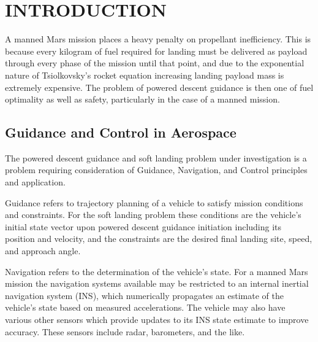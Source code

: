 %

\chapter{INTRODUCTION}
\label{chap:intro}
A manned Mars mission places a heavy penalty on propellant inefficiency. This is because every kilogram of fuel required for landing must be delivered as payload through every phase of the mission until that point, and due to the exponential nature of Tsiolkovsky's rocket equation increasing landing payload mass is extremely expensive. The problem of powered descent guidance is then one of fuel optimality as well as safety, particularly in the case of a manned mission. 


\section{Guidance and Control in Aerospace} \label{sec:guidancevcontrol}
The powered descent guidance and soft landing problem under investigation is a problem requiring consideration of Guidance, Navigation, and Control principles and application. 

Guidance refers to trajectory planning of a vehicle to satisfy mission conditions and constraints. For the soft landing problem these conditions are the vehicle's initial state vector upon powered descent guidance initiation including its position and velocity, and the constraints are the desired final landing site, speed, and approach angle.

Navigation refers to the determination of the vehicle's state. For a manned Mars mission the navigation systems available may be restricted to an internal inertial navigation system (INS), which numerically propagates an estimate of the vehicle's state based on measured accelerations. The vehicle may also have various other sensors which provide updates to its INS state estimate to improve accuracy. These sensors include radar, barometers, and the like.

